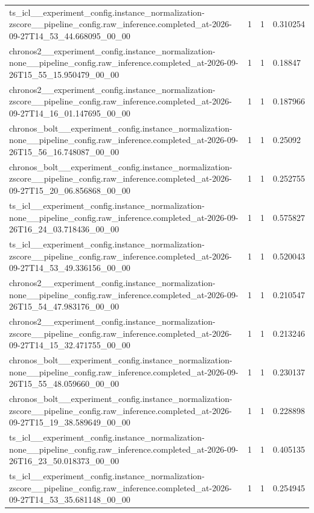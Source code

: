 \begin{tabular}{llll}
ts\_icl\_\_experiment\_config.instance\_normalization-zscore\_\_pipeline\_config.raw\_inference.completed\_at-2026-09-27T14\_53\_44.668095\_00\_00 & 1 & 1 & 0.310254 \\
chronos2\_\_experiment\_config.instance\_normalization-none\_\_pipeline\_config.raw\_inference.completed\_at-2026-09-26T15\_55\_15.950479\_00\_00 & 1 & 1 & 0.18847 \\
chronos2\_\_experiment\_config.instance\_normalization-zscore\_\_pipeline\_config.raw\_inference.completed\_at-2026-09-27T14\_16\_01.147695\_00\_00 & 1 & 1 & 0.187966 \\
chronos\_bolt\_\_experiment\_config.instance\_normalization-none\_\_pipeline\_config.raw\_inference.completed\_at-2026-09-26T15\_56\_16.748087\_00\_00 & 1 & 1 & 0.25092 \\
chronos\_bolt\_\_experiment\_config.instance\_normalization-zscore\_\_pipeline\_config.raw\_inference.completed\_at-2026-09-27T15\_20\_06.856868\_00\_00 & 1 & 1 & 0.252755 \\
ts\_icl\_\_experiment\_config.instance\_normalization-none\_\_pipeline\_config.raw\_inference.completed\_at-2026-09-26T16\_24\_03.718436\_00\_00 & 1 & 1 & 0.575827 \\
ts\_icl\_\_experiment\_config.instance\_normalization-zscore\_\_pipeline\_config.raw\_inference.completed\_at-2026-09-27T14\_53\_49.336156\_00\_00 & 1 & 1 & 0.520043 \\
chronos2\_\_experiment\_config.instance\_normalization-none\_\_pipeline\_config.raw\_inference.completed\_at-2026-09-26T15\_54\_47.983176\_00\_00 & 1 & 1 & 0.210547 \\
chronos2\_\_experiment\_config.instance\_normalization-zscore\_\_pipeline\_config.raw\_inference.completed\_at-2026-09-27T14\_15\_32.471755\_00\_00 & 1 & 1 & 0.213246 \\
chronos\_bolt\_\_experiment\_config.instance\_normalization-none\_\_pipeline\_config.raw\_inference.completed\_at-2026-09-26T15\_55\_48.059660\_00\_00 & 1 & 1 & 0.230137 \\
chronos\_bolt\_\_experiment\_config.instance\_normalization-zscore\_\_pipeline\_config.raw\_inference.completed\_at-2026-09-27T15\_19\_38.589649\_00\_00 & 1 & 1 & 0.228898 \\
ts\_icl\_\_experiment\_config.instance\_normalization-none\_\_pipeline\_config.raw\_inference.completed\_at-2026-09-26T16\_23\_50.018373\_00\_00 & 1 & 1 & 0.405135 \\
ts\_icl\_\_experiment\_config.instance\_normalization-zscore\_\_pipeline\_config.raw\_inference.completed\_at-2026-09-27T14\_53\_35.681148\_00\_00 & 1 & 1 & 0.254945 \\

\end{tabular}
